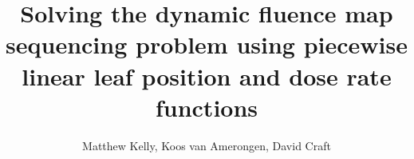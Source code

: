 

\title{Solving the dynamic fluence map sequencing problem using piecewise linear leaf position and dose rate functions}

\author{Matthew Kelly, Koos van Amerongen, David Craft}



\maketitle
\thispagestyle{empty}

















